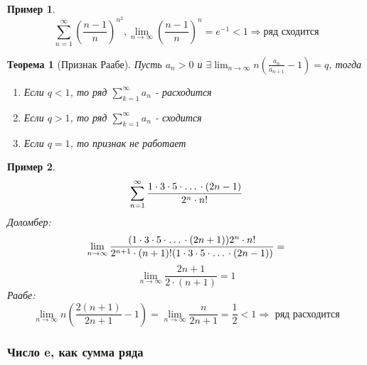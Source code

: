 \documentclass[a4paper]{article}
\newtheorem{theorem}{Теорема}
\theoremstyle{definition}
\newtheorem*{exmp}{Пример}
\numberwithin{theorem}{subsection}
\numberwithin{lemma}{subsection}
\numberwithin{definition}{subsection}
\numberwithin{comment*}{subsection}
\numberwithin{consequence}{subsection}
\numberwithin{property}{subsection}
\begin{document}
\begin{exmp}
 $$\sum_{n=1}^{\infty}{(\frac{n-1}{n})^{n^2}}, \lim_{n \rightarrow \infty}{(\frac{n-1}{n})^{n}}=e^{-1} < 1 \Rightarrow \text{ряд сходится}$$
\end{exmp}
\begin{theorem}[Признак Раабе]
 Пусть $a_n > 0 $ и $\exists{\lim_{n \rightarrow \infty}{n(\frac{a_n}{a_{n+1}}-1)}} = q$, тогда
 \begin{enumerate}
  \item Если $ q < 1$, то ряд $\sum_{k=1}^{\infty}{a_n} $ - расходится
  \item Если $ q > 1$, то ряд $\sum_{k=1}^{\infty}{a_n} $ - сходится
  \item Если $ q = 1$, то признак не работает
 \end{enumerate}
\end{theorem}
\begin{exmp}
 $$\sum_{n=1}^{\infty}{\frac{1 \cdot 3 \cdot 5 \cdot \textit{\dots} \cdot (2n-1)}{2^n \cdot n!}}$$
 \textit{Доломбер: } $$  \lim_{n \rightarrow \infty}{\frac{(1 \cdot 3 \cdot 5 \cdot \textit{\dots} \cdot (2n+1)) 2^n \cdot n!} {2^{n+1} \cdot (n+1)!(1 \cdot 3 \cdot 5 \cdot \textit{\dots} \cdot (2n-1))}} =$$
 $$\lim_{n \rightarrow \infty}{\frac{2n+1}{2\cdot(n+1)}} = 1 $$
 \textit{Раабе: } $$ \lim_{n \rightarrow \infty}{n(\frac{2(n+1)}{2n+1}-1)} = \lim_{n \rightarrow \infty}{\frac{n}{2n+1}} = \frac{1}{2} < 1 \Rightarrow \text{ ряд расходится}$$
\end{exmp}

\subsubsection{Число e, как сумма ряда}
\end{document}
